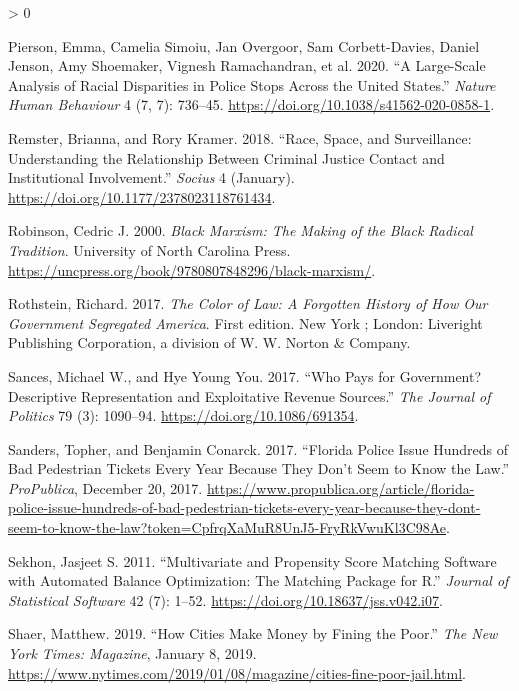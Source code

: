 \documentclass[
  12pt,
]{article}
\newlength{\cslhangindent}
\newenvironment{CSLReferences}[2] %
 {%
  \setlength{\parindent}{0pt}
  \ifodd #1 \everypar{\setlength{\hangindent}{\cslhangindent}}\ignorespaces\fi
  \ifnum #2 > 0
  \setlength{\parskip}{#2\baselineskip}
  \fi
 }%
 {}
\begin{document}
\begin{CSLReferences}{1}{0}
\leavevmode\hypertarget{ref-Pierson2020}{}%
Pierson, Emma, Camelia Simoiu, Jan Overgoor, Sam Corbett-Davies, Daniel Jenson, Amy Shoemaker, Vignesh Ramachandran, et al. 2020. {``A Large-Scale Analysis of Racial Disparities in Police Stops Across the {United States}.''} \emph{Nature Human Behaviour} 4 (7, 7): 736--45. \url{https://doi.org/10.1038/s41562-020-0858-1}.

\leavevmode\hypertarget{ref-Remster2018a}{}%
Remster, Brianna, and Rory Kramer. 2018. {``Race, {Space}, and {Surveillance}: {Understanding} the {Relationship} Between {Criminal Justice Contact} and {Institutional Involvement}.''} \emph{Socius} 4 (January). \url{https://doi.org/10.1177/2378023118761434}.

\leavevmode\hypertarget{ref-Robinson2000}{}%
Robinson, Cedric J. 2000. \emph{Black {Marxism}: The {Making} of the {Black Radical Tradition}}. {University of North Carolina Press}. \url{https://uncpress.org/book/9780807848296/black-marxism/}.

\leavevmode\hypertarget{ref-Rothstein2017}{}%
Rothstein, Richard. 2017. \emph{The Color of Law: A Forgotten History of How Our Government Segregated {America}}. First edition. {New York ; London}: {Liveright Publishing Corporation, a division of W. W. Norton \& Company}.

\leavevmode\hypertarget{ref-Sances2017}{}%
Sances, Michael W., and Hye Young You. 2017. {``Who {Pays} for {Government}? {Descriptive Representation} and {Exploitative Revenue Sources}.''} \emph{The Journal of Politics} 79 (3): 1090--94. \url{https://doi.org/10.1086/691354}.

\leavevmode\hypertarget{ref-Sanders2017}{}%
Sanders, Topher, and Benjamin Conarck. 2017. {``Florida {Police Issue Hundreds} of {Bad Pedestrian Tickets Every Year Because They Don}'t {Seem} to {Know} the {Law}.''} \emph{ProPublica}, December 20, 2017. \url{https://www.propublica.org/article/florida-police-issue-hundreds-of-bad-pedestrian-tickets-every-year-because-they-dont-seem-to-know-the-law?token=CpfrqXaMuR8UnJ5-FryRkVwuKl3C98Ae}.

\leavevmode\hypertarget{ref-Sekhon2011}{}%
Sekhon, Jasjeet S. 2011. {``Multivariate and {Propensity Score Matching Software} with {Automated Balance Optimization}: {The Matching} Package for {R}.''} \emph{Journal of Statistical Software} 42 (7): 1--52. \url{https://doi.org/10.18637/jss.v042.i07}.

\leavevmode\hypertarget{ref-Shaer2019}{}%
Shaer, Matthew. 2019. {``How {Cities Make Money} by {Fining} the {Poor}.''} \emph{The New York Times: Magazine}, January 8, 2019. \url{https://www.nytimes.com/2019/01/08/magazine/cities-fine-poor-jail.html}.


\end{CSLReferences}
\end{document}
